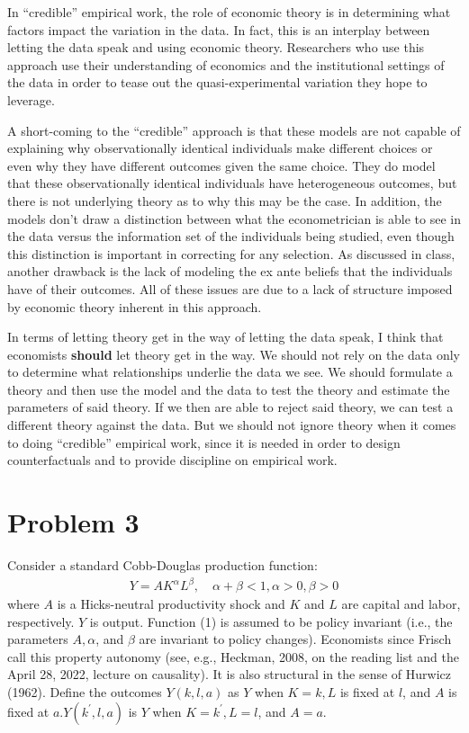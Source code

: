 \documentclass{article}
\begin{document}
In ``credible'' empirical work, the role of economic theory is in determining what factors impact the variation in the data. In fact, this is an interplay between letting the data speak and using economic theory. Researchers who use this approach use their understanding of economics and the institutional settings of the data in order to tease out the quasi-experimental variation they hope to leverage.

A short-coming to the ``credible'' approach is that these models are not capable of explaining why observationally identical individuals make different choices or even why they have different outcomes given the same choice. They do model that these observationally identical individuals have heterogeneous outcomes, but there is not underlying theory as to why this may be the case. In addition, the models don't draw a distinction between what the econometrician is able to see in the data versus the information set of the individuals being studied, even though this distinction is important in correcting for any selection. As discussed in class, another drawback is the lack of modeling the ex ante beliefs that the individuals have of their outcomes. All of these issues are due to a lack of structure imposed by economic theory inherent in this approach. 

In terms of letting theory get in the way of letting the data speak, I think that economists \textbf{should} let theory get in the way. We should not rely on the data only to determine what relationships underlie the data we see. We should formulate a theory and then use the model and the data to test the theory and estimate the parameters of said theory. If we then are able to reject said theory, we can test a different theory against the data. But we should not ignore theory when it comes to doing ``credible'' empirical work, since it is needed in order to design counterfactuals and to provide discipline on empirical work.

\newpage

\section*{Problem 3}
Consider a standard Cobb-Douglas production function:
\begin{align}\label{eq:eq1p3}
Y=A K^{\alpha} L^{\beta}, \quad \alpha+\beta<1, \alpha>0, \beta>0
\end{align}
where $A$ is a Hicks-neutral productivity shock and $K$ and $L$ are capital and labor, respectively. $Y$ is output. Function (1) is assumed to be policy invariant (i.e., the parameters $A, \alpha$, and $\beta$ are invariant to policy changes). Economists since Frisch call this property autonomy (see, e.g., Heckman, 2008, on the reading list and the April 28, 2022, lecture on causality). It is also structural in the sense of Hurwicz (1962). Define the outcomes $Y(k, l, a)$ as $Y$ when $K=k, L$ is fixed at $l$, and $A$ is fixed at $a . Y\left(k^{\prime}, l, a\right)$ is $Y$ when $K=k^{\prime}, L=l$, and $A=a$.
 
\end{document}
